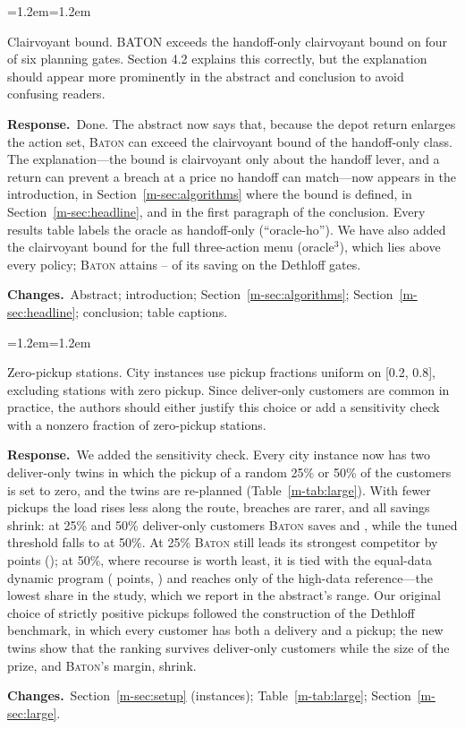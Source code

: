 \documentclass[11pt]{article}
\newenvironment{comment}{\par\medskip\noindent\color{rev}\itshape
  \begin{list}{}{\leftmargin=1.2em\rightmargin=1.2em}\item[]}%
  {\end{list}\par}
\newcommand{\resp}{\par\noindent\textbf{Response.}\ }
\newcommand{\chg}{\par\noindent\textbf{Changes.}\ }
\newcommand{\sref}[1]{Section~\ref{m-#1}}
\newcommand{\tref}[1]{Table~\ref{m-#1}}
\newcommand{\BATON}{\textsc{Baton}}
\begin{document}
\begin{comment}
Clairvoyant bound. BATON exceeds the handoff-only clairvoyant bound on
four of six planning gates. Section 4.2 explains this correctly, but the
explanation should appear more prominently in the abstract and
conclusion to avoid confusing readers.
\end{comment}
\resp Done. The abstract now says that, because the depot return
enlarges the action set, \BATON{} can exceed the clairvoyant bound of the
handoff-only class. The explanation---the bound is clairvoyant only
about the handoff lever, and a return can prevent a breach at a price no
handoff can match---now appears in the introduction, in
\sref{sec:algorithms} where the bound is defined, in \sref{sec:headline},
and in the first paragraph of the conclusion. Every results table
labels the oracle as handoff-only (``oracle-ho''). We have also added
the clairvoyant bound for the full three-action menu (oracle$^3$), which
lies above every policy; \BATON{} attains
\ratioOrcThreeLo--\ratioOrcThreeHi{} of its saving on the Dethloff
gates.
\chg Abstract; introduction; \sref{sec:algorithms}; \sref{sec:headline};
conclusion; table captions.

\begin{comment}
Zero-pickup stations. City instances use pickup fractions uniform on
[0.2, 0.8], excluding stations with zero pickup. Since deliver-only
customers are common in practice, the authors should either justify
this choice or add a sensitivity check with a nonzero fraction of
zero-pickup stations.
\end{comment}
\resp We added the sensitivity check. Every city instance now has two
deliver-only twins in which the pickup of a random 25\% or 50\% of the
customers is set to zero, and the twins are re-planned
(\tref{tab:large}). With fewer pickups the load rises less along the
route, breaches are rarer, and all savings shrink: at 25\% and 50\%
deliver-only customers \BATON{} saves \svZpTwentyFiveBaton{} and
\svZpFiftyBaton{}, while the tuned threshold falls to \svZpFiftyThr{} at
50\%. At 25\% \BATON{} still leads its strongest competitor by
\lgZpTwentyFiveDelta{} points (\lgZpTwentyFiveDeltaCI); at 50\%, where
recourse is worth least, it is tied with the equal-data dynamic program
(\lgZpFiftyDelta{} points, \lgZpFiftyDeltaCI) and reaches only
\lgZpFiftyRatio{} of the high-data reference---the lowest share in the
study, which we report in the abstract's range. Our original choice of
strictly positive pickups followed the construction of the Dethloff
benchmark, in which every customer has both a delivery and a pickup; the
new twins show that the ranking survives deliver-only customers while
the size of the prize, and \BATON's margin, shrink.
\chg \sref{sec:setup} (instances); \tref{tab:large}; \sref{sec:large}.
\end{document}
